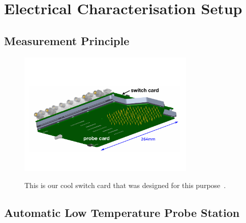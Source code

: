 \section{Electrical Characterisation Setup}
\label{sec:setup}

\subsection{Measurement Principle}
\label{subsec:setup_principle}
\begin{figure}[h]
	\centering
	\includegraphics[width=0.75\textwidth]{figures/example_switchprobecard.pdf}
	\label{fig:switchprobecard_CAD}
	\caption{
	This is our cool switch card that was designed for this purpose~\cite{pitters:array2019}.
	}
\end{figure}



\subsection{Automatic Low Temperature Probe Station}
\label{subsec:setup_ALPS}

